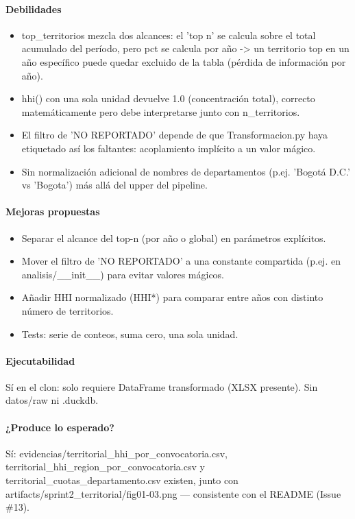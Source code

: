 \paragraph{Debilidades}
\begin{itemize}
  \item top\_territorios mezcla dos alcances: el 'top n' se calcula sobre el total acumulado del período, pero pct se calcula por año -> un territorio top en un año específico puede quedar excluido de la tabla (pérdida de información por año).
  \item hhi() con una sola unidad devuelve 1.0 (concentración total), correcto matemáticamente pero debe interpretarse junto con n\_territorios.
  \item El filtro de 'NO REPORTADO' depende de que Transformacion.py haya etiquetado así los faltantes: acoplamiento implícito a un valor mágico.
  \item Sin normalización adicional de nombres de departamentos (p.ej. 'Bogotá D.C.' vs 'Bogota') más allá del upper del pipeline.
\end{itemize}

\paragraph{Mejoras propuestas}
\begin{itemize}
  \item Separar el alcance del top-n (por año o global) en parámetros explícitos.
  \item Mover el filtro de 'NO REPORTADO' a una constante compartida (p.ej. en analisis/\_\_init\_\_) para evitar valores mágicos.
  \item Añadir HHI normalizado (HHI*) para comparar entre años con distinto número de territorios.
  \item Tests: serie de conteos, suma cero, una sola unidad.
\end{itemize}

\paragraph{Ejecutabilidad}
Sí en el clon: solo requiere DataFrame transformado (XLSX presente). Sin datos/raw ni .duckdb.

\paragraph{¿Produce lo esperado?}
Sí: evidencias/territorial\_hhi\_por\_convocatoria.csv, territorial\_hhi\_region\_por\_convocatoria.csv y territorial\_cuotas\_departamento.csv existen, junto con artifacts/sprint2\_territorial/fig01-03.png --- consistente con el README (Issue \#13).

